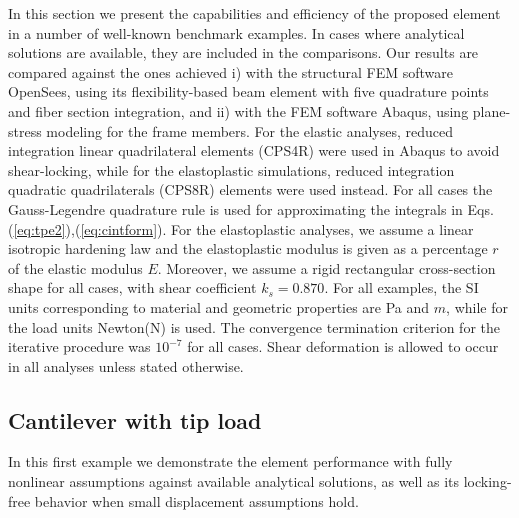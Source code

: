 In this section we present the capabilities and efficiency of the proposed
element in a number of well-known benchmark examples. In cases where analytical
solutions are available, they are included in the comparisons. Our results are
compared against the ones achieved i) with the structural FEM software
OpenSees\cite{OpenSees}, using its flexibility-based beam element
\cite{Neuenhofer,Neuenhofer2} with five quadrature points and fiber section
integration, and ii) with the FEM software Abaqus\cite{Abaqus}, using
plane-stress modeling for the frame members. For the
elastic analyses, reduced integration linear quadrilateral elements (CPS4R) were
used in Abaqus to avoid shear-locking, while for the elastoplastic
simulations, reduced integration quadratic quadrilaterals (CPS8R) elements
were used instead. For all cases the Gauss-Legendre
quadrature rule is used for approximating the integrals in Eqs.
(\ref{eq:tpe2}),(\ref{eq:cintform}). For the elastoplastic analyses, we assume
a linear isotropic hardening law and the elastoplastic modulus is given
as a percentage $r$ of the elastic modulus $E$. Moreover, we assume a
rigid rectangular cross-section shape for all cases, with shear coefficient
$k_s=0.870$\cite{Cowper}. For all examples, the SI units corresponding to
material and geometric properties are Pa and $m$, while for the load units
Newton(N) is used. The convergence termination criterion for the iterative
procedure was $10^{-7}$ for all cases. Shear deformation is
allowed to occur in all analyses unless stated otherwise.


\subsection{Cantilever with tip load}

In this first example we demonstrate the element performance with fully 
nonlinear assumptions against available analytical solutions, 
as well as its locking-free behavior when small displacement assumptions
hold.

